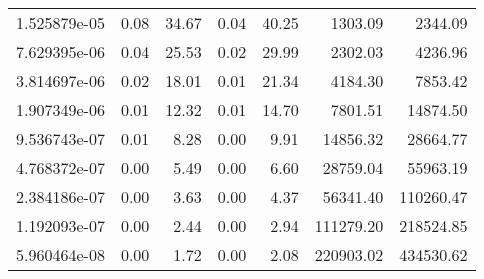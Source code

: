 \begin{tabular}{lrrrrrr}
1.525879e-05 &        0.08 &         34.67 &           0.04 &        40.25 &          1303.09 &         2344.09 \\
7.629395e-06 &        0.04 &         25.53 &           0.02 &        29.99 &          2302.03 &         4236.96 \\
3.814697e-06 &        0.02 &         18.01 &           0.01 &        21.34 &          4184.30 &         7853.42 \\
1.907349e-06 &        0.01 &         12.32 &           0.01 &        14.70 &          7801.51 &        14874.50 \\
9.536743e-07 &        0.01 &          8.28 &           0.00 &         9.91 &         14856.32 &        28664.77 \\
4.768372e-07 &        0.00 &          5.49 &           0.00 &         6.60 &         28759.04 &        55963.19 \\
2.384186e-07 &        0.00 &          3.63 &           0.00 &         4.37 &         56341.40 &       110260.47 \\
1.192093e-07 &        0.00 &          2.44 &           0.00 &         2.94 &        111279.20 &       218524.85 \\
5.960464e-08 &        0.00 &          1.72 &           0.00 &         2.08 &        220903.02 &       434530.62 \\
\bottomrule
\end{tabular}
